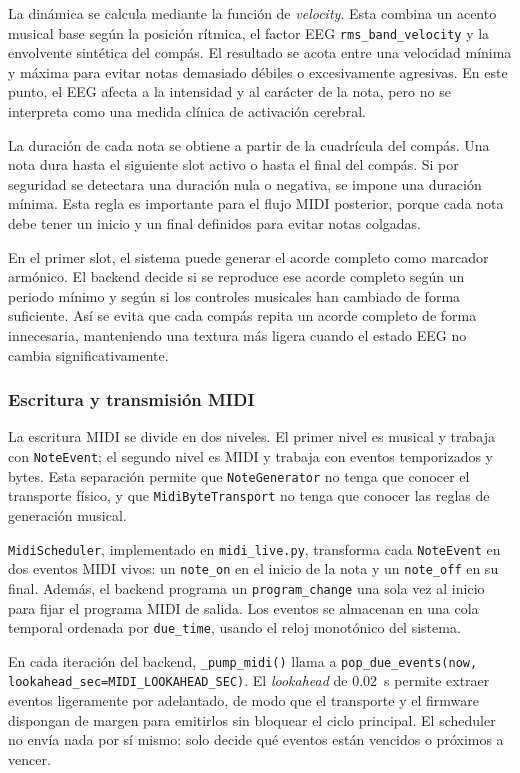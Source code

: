 La dinámica se calcula mediante la función de \textit{velocity}. Esta combina un acento musical base según la posición rítmica, el factor EEG \texttt{rms\_band\_velocity} y la envolvente sintética del compás. El resultado se acota entre una velocidad mínima y máxima para evitar notas demasiado débiles o excesivamente agresivas. En este punto, el EEG afecta a la intensidad y al carácter de la nota, pero no se interpreta como una medida clínica de activación cerebral.

La duración de cada nota se obtiene a partir de la cuadrícula del compás. Una nota dura hasta el siguiente slot activo o hasta el final del compás. Si por seguridad se detectara una duración nula o negativa, se impone una duración mínima. Esta regla es importante para el flujo MIDI posterior, porque cada nota debe tener un inicio y un final definidos para evitar notas colgadas.

En el primer slot, el sistema puede generar el acorde completo como marcador armónico. El backend decide si se reproduce ese acorde completo según un periodo mínimo y según si los controles musicales han cambiado de forma suficiente. Así se evita que cada compás repita un acorde completo de forma innecesaria, manteniendo una textura más ligera cuando el estado EEG no cambia significativamente.

\subsubsection{Escritura y transmisión MIDI}

La escritura MIDI se divide en dos niveles. El primer nivel es musical y trabaja con \texttt{NoteEvent}; el segundo nivel es MIDI y trabaja con eventos temporizados y bytes. Esta separación permite que \texttt{NoteGenerator} no tenga que conocer el transporte físico, y que \texttt{MidiByteTransport} no tenga que conocer las reglas de generación musical.

\texttt{MidiScheduler}, implementado en \texttt{midi\_live.py}, transforma cada \texttt{NoteEvent} en dos eventos MIDI vivos: un \texttt{note\_on} en el inicio de la nota y un \texttt{note\_off} en su final. Además, el backend programa un \texttt{program\_change} una sola vez al inicio para fijar el programa MIDI de salida. Los eventos se almacenan en una cola temporal ordenada por \texttt{due\_time}, usando el reloj monotónico del sistema.

En cada iteración del backend, \texttt{\_pump\_midi()} llama a \texttt{pop\_due\_events(now, lookahead\_sec=MIDI\_LOOKAHEAD\_SEC)}. El \textit{lookahead} de \SI{0.02}{\second} permite extraer eventos ligeramente por adelantado, de modo que el transporte y el firmware dispongan de margen para emitirlos sin bloquear el ciclo principal. El scheduler no envía nada por sí mismo: solo decide qué eventos están vencidos o próximos a vencer.

